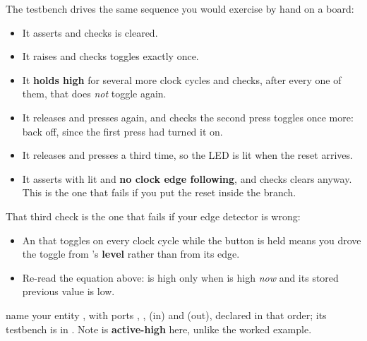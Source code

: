 \begin{parts}
    The testbench drives the same sequence you would exercise by hand on a board:
    \begin{itemize}
      \item It asserts  and checks  is cleared.
      \item It raises  and checks  toggles exactly once.
      \item It \textbf{holds  high} for several more clock cycles and checks, after
        every one of them, that  does \emph{not} toggle again.
      \item It releases and presses again, and checks the second press toggles  once more:
        back off, since the first press had turned it on.
      \item It releases and presses a third time, so the LED is lit when the reset arrives.
      \item It asserts  with  lit and \textbf{no clock edge following}, and
        checks  clears anyway. This is the one that fails if you put the reset inside the
         branch.
    \end{itemize}
    That third check is the one that fails if your edge detector is wrong:
    \begin{itemize}
      \item An  that toggles on every clock cycle while the button is held means you drove
        the toggle from 's \textbf{level} rather than from its edge.
      \item Re-read the equation above:  is high only when  is high
        \emph{now} and its stored previous value is low.
    \end{itemize}
\end{parts}


\selfcheck name your entity , with ports , ,
 (in) and  (out), declared in that order; its testbench is in
. Note  is \textbf{active-high} here, unlike the
worked example.
